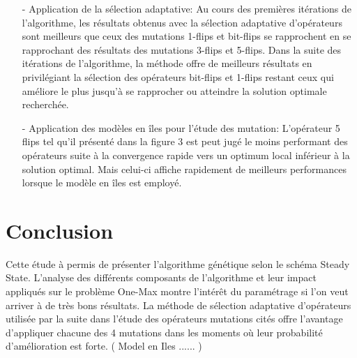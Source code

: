\documentclass[twocolumn]{article}
\begin{document}
\begin{itemize}
\item[-]Application de la sélection adaptative:
Au cours des premières itérations de l'algorithme, les résultats obtenus avec la sélection adaptative d'opérateurs sont meilleurs que ceux des mutations 1-flips et bit-flips se rapprochent en se rapprochant des résultats des mutations 3-flips et 5-flips. Dans la suite des itérations de l'algorithme, la méthode offre de meilleurs  résultats en privilégiant la sélection des opérateurs bit-flips et 1-flips restant ceux qui améliore le plus jusqu'à se rapprocher ou atteindre la solution optimale recherchée.

\item[-]Application des modèles en îles pour l'étude des mutation:
L'opérateur  5 flips tel qu'il présenté dans la figure 3 est peut jugé le  moins  performant des opérateurs suite à la convergence rapide vers un optimum local inférieur à la solution optimal. Mais celui-ci affiche rapidement de meilleurs performances lorsque le modèle en îles est employé.
\end{itemize}

\section{Conclusion}

Cette étude à permis de présenter l'algorithme génétique selon le schéma Steady State. L'analyse des différents composants de l'algorithme et leur impact appliqués sur le problème One-Max  montre l'intérêt du paramétrage si l'on veut arriver à de très bons résultats. La méthode de sélection adaptative d'opérateurs utilisée par la suite dans l'étude des opérateurs mutations cités offre l'avantage d'appliquer chacune des 4 mutations dans les moments où leur probabilité d'amélioration est forte.  ( Model en Iles ...... )


\begin{thebibliography}{9}
\end{thebibliography}
\end{document}
